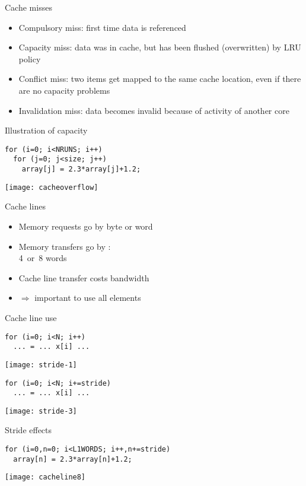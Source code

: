 \begin{frame}{Cache misses}
  \begin{itemize}
  \item Compulsory miss: first time data is referenced
  \item Capacity miss: data was in cache, but has been flushed (overwritten)
    by LRU policy
  \item Conflict miss: two items get mapped to the same cache location,
    even if there are no capacity problems
  \item Invalidation miss: data becomes invalid because of activity of another core
  \end{itemize}  
\end{frame}

\begin{frame}[fragile]{Illustration of capacity}
\small
\begin{verbatim}
for (i=0; i<NRUNS; i++)
  for (j=0; j<size; j++)
    array[j] = 2.3*array[j]+1.2;
\end{verbatim}
  \texttt{[image: cacheoverflow]}
\end{frame}

\begin{frame}{Cache lines}
  \begin{itemize}
  \item Memory requests go by byte or word
  \item Memory transfers go by :\\ 4~or~8 words
  \item Cache line transfer costs bandwidth
  \item $\Rightarrow$ important to use all elements
  \end{itemize}
\end{frame}

\begin{frame}[fragile]{Cache line use}
\begin{verbatim}
for (i=0; i<N; i++)
  ... = ... x[i] ...
\end{verbatim}
  \texttt{[image: stride-1]}
\begin{verbatim}
for (i=0; i<N; i+=stride)
  ... = ... x[i] ...
\end{verbatim}
  \texttt{[image: stride-3]}
\end{frame}

\begin{frame}[fragile]{Stride effects}
\small
\begin{verbatim}
for (i=0,n=0; i<L1WORDS; i++,n+=stride)
  array[n] = 2.3*array[n]+1.2;
\end{verbatim}
  \texttt{[image: cacheline8]}
\end{frame}

